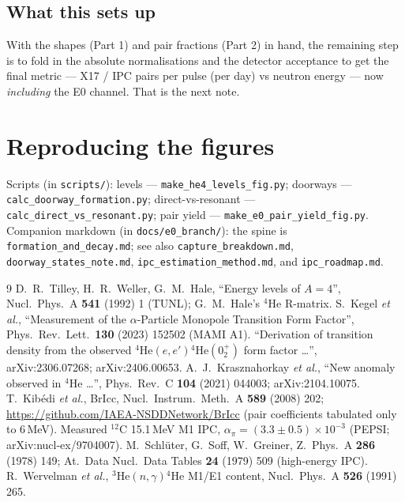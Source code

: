 \documentclass[11pt,a4paper]{article}
\newcommand{\He}[1]{$^{#1}$He}
\begin{document}
\subsection*{What this sets up}
With the shapes (Part 1) and pair fractions (Part 2) in hand, the remaining step
is to fold in the absolute normalisations and the detector acceptance to get the
final metric --- X17 / IPC pairs per pulse (per day) vs neutron energy --- now
\emph{including} the E0 channel. That is the next note.

\section*{Reproducing the figures}
{\raggedright
Scripts (in \texttt{scripts/}): levels --- \texttt{make\_he4\_levels\_fig.py};
doorways --- \texttt{calc\_doorway\_formation.py}; direct-vs-resonant ---
\texttt{calc\_direct\_vs\_resonant.py}; pair yield ---
\texttt{make\_e0\_pair\_yield\_fig.py}.
Companion markdown (in \texttt{docs/e0\_branch/}): the spine is
\texttt{formation\_and\_decay.md}; see also \texttt{capture\_breakdown.md},
\texttt{doorway\_states\_note.md}, \texttt{ipc\_estimation\_method.md}, and
\texttt{ipc\_roadmap.md}.
\par}

\begin{thebibliography}{9}
\small\sloppy
{} D.~R.~Tilley, H.~R.~Weller, G.~M.~Hale, ``Energy levels of
  $A=4$'', Nucl.\ Phys.\ A \textbf{541} (1992) 1 (TUNL); G.~M.~Hale's \He{4}
  R-matrix.
 S.~Kegel \emph{et al.}, ``Measurement of the $\alpha$-Particle
  Monopole Transition Form Factor'', Phys.\ Rev.\ Lett.\ \textbf{130} (2023)
  152502 (MAMI A1).
 ``Derivation of transition density from the observed
  \He{4}$(e,e')$\He{4}$(0^+_2)$ form factor \dots'', arXiv:2306.07268;
  arXiv:2406.00653.
 A.~J.~Krasznahorkay \emph{et al.}, ``New anomaly observed in
  \He{4} \dots'', Phys.\ Rev.\ C \textbf{104} (2021) 044003; arXiv:2104.10075.
 T.~Kib\'edi \emph{et al.}, BrIcc, Nucl.\ Instrum.\ Meth.\ A
  \textbf{589} (2008) 202; \url{https://github.com/IAEA-NSDDNetwork/BrIcc}
  (pair coefficients tabulated only to 6\,MeV).
 Measured $^{12}$C 15.1\,MeV M1 IPC, $\alpha_\pi=(3.3\pm0.5)
  \times10^{-3}$ (PEPSI; arXiv:nucl-ex/9704007).
 M.~Schl\"uter, G.~Soff, W.~Greiner, Z.~Phys.\ A \textbf{286} (1978)
  149; At.\ Data Nucl.\ Data Tables \textbf{24} (1979) 509 (high-energy IPC).
 R.~Wervelman \emph{et al.}, \He{3}$(n,\gamma)$\He{4} M1/E1
  content, Nucl.\ Phys.\ A \textbf{526} (1991) 265.
\end{thebibliography}
\end{document}
